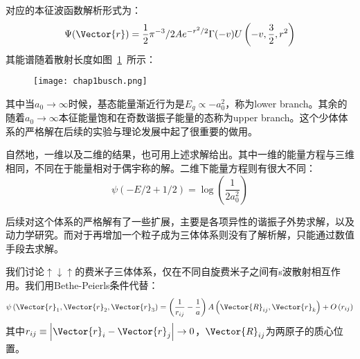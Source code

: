 对应的本征波函数解析形式为：
\begin{equation}
\Psi(\Vector{r})=\frac{1}{2} \pi^{-3} / 2 A e^{-r^{2} / 2} \Gamma(-v) U\left(-v, \frac{3}{2}, r^{2}\right)
\end{equation}
其能谱随着散射长度如图~\ref{chap1busch}~所示：
\begin{figure}[!htbp]
    \centering
    \texttt{[image: chap1busch.png]}
    \label{chap1busch}
\end{figure}
其中当$a_0\to \infty$时候，基态能量渐近行为是$E_g\propto - a_0^2$，称为lower branch。其余的随着$a_0\to\infty$本征能量饱和在奇数谐振子能量的态称为upper branch。这个少体体系的严格解在后续的实验与理论发展中起了很重要的做用。

自然地，一维以及二维的结果，也可用上述求解给出。其中一维的能量方程与三维相同，不同在于能量相对于偶宇称的解。二维下能量方程则有很大不同：
\begin{equation}
\psi(-E / 2+1 / 2)=\log \left(\frac{1}{2 a_{0}^{2}}\right)
\end{equation}

后续对这个体系的严格解有了一些扩展，主要是各项异性的谐振子外势求解，以及动力学研究\cite{blume2012few}。而对于再增加一个粒子成为三体体系则没有了解析解，只能通过数值手段去求解。

我们讨论$\uparrow\downarrow\uparrow$的费米子三体体系，仅在不同自旋费米子之间有s波散射相互作用\cite{OlshaniiRigorous2001,Petrov2003unitary3b,Fleix2006prlunitary3b,Felix2006praunitary3b,LmDuan2007levelcrossing,Stetcu2007,Blume2008,Blume2010,Xiaji2009prl,Xiaji20103b,Rittenhouse2010green}。我们用Bethe-Peierls条件代替：
\begin{equation}
\psi\left(\Vector{r}_{1}, \Vector{r}_{2}, \Vector{r}_{3}\right)=\left(\frac{1}{r_{i j}}-\frac{1}{a}\right) A\left(\Vector{R}_{i j}, \Vector{r}_{k}\right)+O\left(r_{i j}\right)
\end{equation}
其中$r_{i j} \equiv\left|\Vector{r}_{i}-\Vector{r}_{j}\right| \rightarrow 0$，$\Vector{R}_{ij}$为两原子的质心位置。

